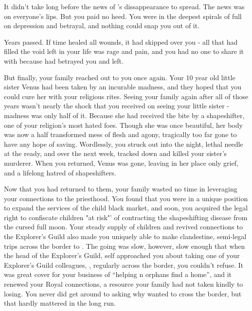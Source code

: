 \documentclass[char]{NeptuneBall}
\begin{document}
It didn't take long before the news of \cAriel{}'s dissappearance to spread. The news was on everyone's lips. But you paid no heed. You were in the deepest spirals of full on depression and betrayal, and nothing could snap you out of it.

Years passed. If time healed all wounds, it had skipped over you - all that had filled the void left in your life was rage and pain, and you had no one to share it with because \emph{\cAriel{\they}} had betrayed you and left.

But finally, your family reached out to you once again. Your 10 year old little sister Venus had been taken by an incurable madness, and they hoped that you could cure her with your religious rites. Seeing your family again after all of those years wasn't nearly the shock that you received on seeing your little sister - madness was only half of it. Because she had received the bite by a shapeshifter, one of your religion's most hated foes. Though she was once beautiful, her body was now a half transformed mess of flesh and agony, tragically too far gone to have any hope of saving. Wordlessly, you struck out into the night, lethal needle at the ready, and over the next week, tracked down and killed your sister's murderer. When you returned, Venus was gone, leaving in her place only grief, and a lifelong hatred of shapeshifters.

Now that you had returned to them, your family wasted no time in leveraging your connections to the priesthood. You found that you were in a unique position to expand the services of the child black market, and soon, you acquired the legal right to confiscate children "at risk"' of contracting the shapeshifting disease from the cursed full moon. Your steady supply of children and revived connections to the Explorer's Guild also made you uniquely able to make clandestine, semi-legal trips across the border to \pPacifica{}. The going was slow, however, slow enough that when the head of the Explorer's Guild, \cPlant{\Prince} \cPlant \cPlant{\them}self approached you about taking one of your Explorer's Guild colleagues, \cPlant{\their} \cPrincess{\nephew}, \cPrincess{\Prince} \cPrincess{} regularly across the border, you couldn't refuse. It was great cover for your business of "`helping \cAtlantis{}n orphans find a home"', and it renewed your Royal connections, a resource your family had not taken kindly to losing. You never did get around to asking why \cPrincess{\cthey} wanted to cross the border, but that hardly mattered in the long run.
\end{document}
